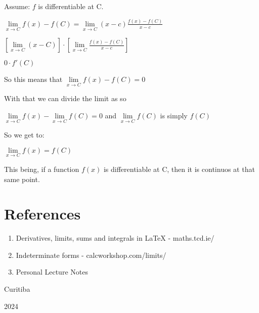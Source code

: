 \documentclass{article}
\begin{document}
Assume: $f$ is differentiable at C.

{\large $\lim\limits_{x \to C} f(x) - f(C) = \lim\limits_{x \to C} (x-c) \frac{f(x) - f(C)}{x-c}$}

\vspace{0.5cm}

{\large $[\lim\limits_{x \to C} (x-C)] \cdot [\lim\limits_{x \to C} \frac{f(x) - f(C)}{x-c}]$}

\vspace{0.5cm}

{\large $0 \cdot f'(C)$}

\vspace{0.5cm}
So this means that {\large $\lim\limits_{x \to C} f(x) - f(C) = 0$}

\vspace{0.5cm}
With that we can divide the limit as so

{\large $\lim\limits_{x \to C} f(x) - \lim\limits_{x \to C} f(C) = 0$ and $\lim\limits_{x \to C} f(C)$ is simply $f(C)$}

\vspace{0.5cm}
So we get to:

\vspace{0.1cm}

{\large $\lim\limits_{x \to C} f(x) = f(C)$}

\vspace{0.5cm}
This being, if a function $f(x)$ is differentiable at C, then it is continuos
at that same point.

\section*{References}
\begin{enumerate}
    \item Derivatives, limits, sums and integrals in LaTeX - maths.tcd.ie/
    \item Indeterminate forms - calcworkshop.com/limits/
    \item Personal Lecture Notes
\end{enumerate}

\vfill
\begin{center}
    Curitiba

    2024
\end{center}
\end{document}
